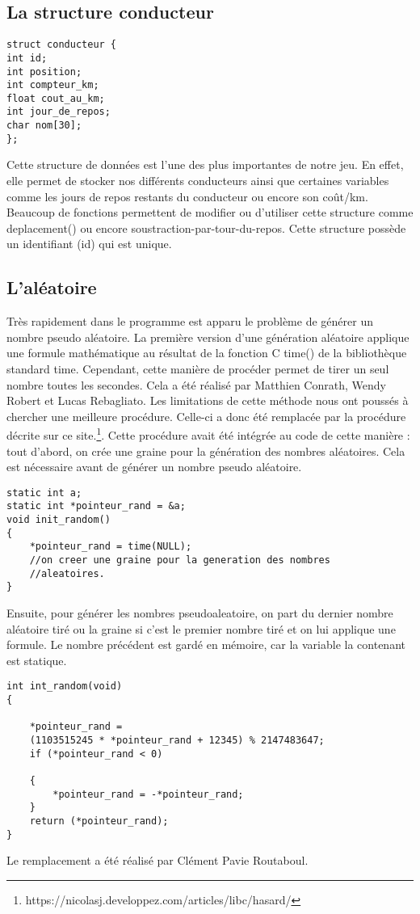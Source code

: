 \documentclass[a4paper, 12pt]{article}
\begin{document}
    \subsection{La structure conducteur}
\begin{lstlisting}        
struct conducteur {
int id;
int position;
int compteur_km;
float cout_au_km;
int jour_de_repos;
char nom[30];
};\end{lstlisting}
Cette structure de données est l'une des plus importantes de notre jeu. En effet, elle permet de stocker nos différents conducteurs ainsi que certaines variables comme les jours de repos restants du conducteur ou encore son coût/km. Beaucoup de fonctions permettent de modifier ou d'utiliser cette structure comme deplacement() ou encore soustraction-par-tour-du-repos. Cette structure possède un identifiant (id) qui est unique.

\newpage

    \subsection{L'aléatoire}
        Très rapidement dans le programme est apparu le problème de générer un nombre pseudo aléatoire.
        La première version d'une génération aléatoire applique une formule mathématique au résultat de la fonction C time() de la bibliothèque standard time. Cependant, cette manière de procéder permet de tirer un seul nombre toutes les secondes.
        Cela a été réalisé par Matthien Conrath, Wendy Robert et Lucas Rebagliato.
        \newline
        Les limitations de cette méthode nous ont poussés à chercher une meilleure procédure.
        Celle-ci a donc été remplacée par la procédure décrite sur ce site.\footnote{https://nicolasj.developpez.com/articles/libc/hasard/}.
                Cette procédure avait été intégrée au code de cette manière :
                tout d'abord, on crée une graine pour la génération des nombres aléatoires.
                Cela est nécessaire avant de générer un nombre pseudo aléatoire.
        \begin{lstlisting}
static int a;
static int *pointeur_rand = &a;
void init_random()
{
    *pointeur_rand = time(NULL);
    //on creer une graine pour la generation des nombres 
    //aleatoires.
}
\end{lstlisting}
Ensuite, pour générer les nombres pseudoaleatoire, on part du dernier nombre aléatoire tiré ou la graine si c'est le premier nombre tiré et on lui applique une formule.
Le nombre précédent est gardé en mémoire, car la  variable la contenant est statique.
\begin{lstlisting}
int int_random(void)
{

    *pointeur_rand = 
    (1103515245 * *pointeur_rand + 12345) % 2147483647;
    if (*pointeur_rand < 0)

    {
        *pointeur_rand = -*pointeur_rand;
    }
    return (*pointeur_rand);
}

        \end{lstlisting}
        Le remplacement a été réalisé par Clément Pavie Routaboul.
        
\end{document}
